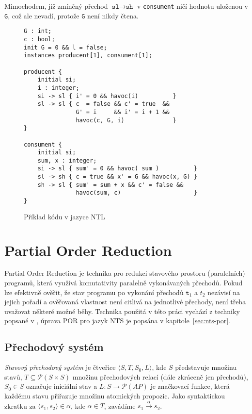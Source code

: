 \documentclass[10pt,a4paper,notitlepage]{report}
\newcommand{\tuple}[1]{\langle #1 \rangle}
\begin{document}
Mimochodem, již zmíněný přechod $\texttt{sl} \rightarrow \texttt{sh}$ v \texttt{consument} ničí hodnotu uloženou v \texttt{G}, což ale nevadí, protože \texttt{G} není nikdy čtena.

\begin{figure}[t]
\begin{lstlisting}
G : int;
c : bool;
init G = 0 && l = false;
instances producent[1], consument[1];

producent {
    initial si;
    i : integer;
    si -> sl { i' = 0 && havoc(i)          }
    sl -> sl { c  = false && c' = true  &&
               G' = i     && i' = i + 1 &&
               havoc(c, G, i)              }
}

consument {
	initial si;
	sum, x : integer;
	si -> sl { sum' = 0 && havoc( sum )          }
	sl -> sh { c = true && x' = G && havoc(x, G) }
	sh -> sl { sum' = sum + x && c' = false &&
	           havoc(sum, c)                     }
}

\end{lstlisting}
\caption{Příklad kódu v jazyce NTL}
\label{fig:nts-prodcons}
\end{figure}

\section{Partial Order Reduction}
Partial Order Reduction je technika pro redukci stavového prostoru (paralelních) programů, která využívá komutativity paralelně vykonávaných přechodů. Pokud lze efektivně ověřit, že stav programu po vykonání přechodů $\texttt{t}_1$ a $t_2$ nezávisí na jejich pořadí a ověřovaná vlastnost není citlivá na jednotlivé přechody, není třeba uvažovat některé možné běhy. Technika použitá v této práci vychází z techniky popsané v \cite{CLARKE}, úprava POR pro jazyk NTS je popsána v kapitole~\ref{sec:nts-por}.

\subsection{Přechodový systém}
\textit{Stavový přechodový systém} je čtveřice $\tuple{S, T, S_0, L}$, kde $S$ představuje množinu stavů, $T \subseteq \mathcal{P}\left({S \times S}\right)$ množinu přechodových relací (dále zkráceně jen přechodů), $S_0 \in S$ označuje iniciální stav a $L : S \rightarrow \mathcal{P}\left({\mathit{AP}}\right)$ je značkovací funkce, která každému stavu přiřazuje množinu atomických propozic. Jako syntaktickou zkratku za $\tuple{s_1, s_2} \in \alpha$, kde $\alpha \in T$, zavádíme $s_1 \xrightarrow{\alpha} s_2$.
\end{document}
